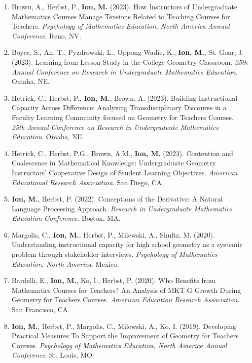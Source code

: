 \documentclass[a4paper,11pt]{article}
\newcommand{\yearsitem}[1]{%
  \item {\reversemarginpar\strut\marginnote{{\small#1}}}%
}
\begin{document}
\begin{enumerate}
\item Brown, A., Herbst, P., \textbf{Ion, M.} (2023). How Instructors of Undergraduate Mathematics Courses Manage Tensions Related to Teaching Courses for Teachers. \emph{Psychology of Mathematics Education, North America Annual Conference}. Reno, NV.

\item Boyce, S., An, T., Pyzdrowski, L., Oppong-Wadie, K., \textbf{Ion, M.}, St. Goar, J. (2023). Learning from Lesson Study in the College Geometry Classroom. \emph{25th Annual Conference on Research in Undergraduate Mathematics Education}. Omaha, NE.

\item Hetrick, C., Herbst, P., \textbf{Ion, M.}, Brown, A. (2023). Building Instructional Capacity Across Difference: Analyzing Transdisciplinary Discourse in a Faculty Learning Community focused on Geometry for Teachers Courses. \emph{25th Annual Conference on Research in Undergraduate Mathematics Education}. Omaha, NE.

\item Hetrick, C., Herbst, P.G., Brown, A.M., \textbf{Ion, M.} (2023). Contention and Coalescence in Mathematical Knowledge: Undergraduate Geometry Instructors' Cooperative Design of Student Learning Objectives. \emph{American Educational Research Association}. San Diego, CA.

\item \textbf{Ion, M.}, Herbst, P. (2022). Conceptions of the Derivative: A Natural Language Processing Approach. \emph{Research in Undergraduate Mathematics Education Conference}. Boston, MA.

\yearsitem{2020}Margolis, C., \textbf{Ion, M.}, Herbst, P., Milewski, A., Shultz, M. (2020). Understanding instructional capacity for high school geometry as a systemic problem through stakeholder interviews. \emph{Psychology of Mathematics Education, North America}. Mexico.

\item Bardelli, E., \textbf{Ion, M.}, Ko, I., Herbst, P. (2020). Who Benefits from Mathematics Courses for Teachers? An Analysis of MKT-G Growth During Geometry for Teachers Courses. \emph{American Education Research Association}. San Francisco, CA.

\yearsitem{2019}\textbf{Ion, M.}, Herbst, P., Margolis, C., Milewski, A., Ko, I. (2019). Developing Practical Measures To Support the Improvement of Geometry for Teachers Courses. \emph{Psychology of Mathematics Education, North America Annual Conference}. St. Louis, MO.


\end{enumerate}
\end{document}
